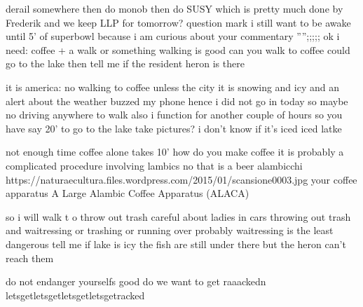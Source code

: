 derail somewhere then do monob then do SUSY which is pretty much done by Frederik and we keep LLP for tomorrow?
question 
mark
i still want to be awake until 5' of superbowl because i am curious about your commentary
'''';;;;; ok
i need: coffee + a walk or something
walking is good
can you walk to coffee 
 could go to the lake
 then tell me if the resident heron is there

it is america: no walking to coffee unless the city
it is snowing and icy and an alert about the weather buzzed my phone
hence i did not go in today
so maybe no driving anywhere to walk
also i function for another couple of hours 
so you have say 20' to go to the lake
take pictures?
i don't know if it's iced
iced latke


not enough time
coffee alone takes 10'
how do you make coffee
it is probably a complicated procedure
involving lambics
no that is a beer
alambicchi
https://naturaecultura.files.wordpress.com/2015/01/scansione0003.jpg
your coffee apparatus
A Large Alambic Coffee Apparatus (ALACA)

so i will walk t
o throw out trash
careful about ladies in cars throwing out trash and waitressing or trashing or running over 
probably waitressing is the least dangerous
tell me if lake is icy
the fish are still under there but the heron can't reach them

do not endanger yourselfs
good
do we want to get raaackedn
letsgetletsgetletsgetletsgetracked